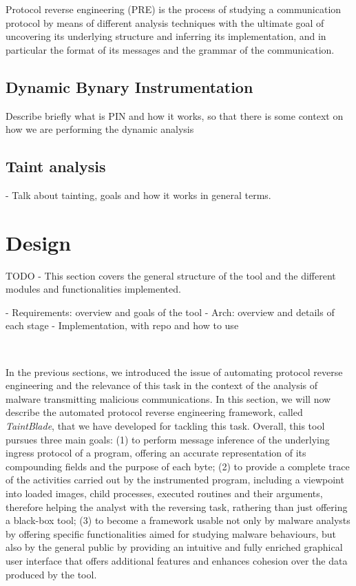 \documentclass[conference]{IEEEtran}
\begin{document}
Protocol reverse engineering (PRE) is the process of studying a communication protocol by means of 
different analysis techniques with the ultimate goal of uncovering its underlying structure and inferring
its implementation, and in particular the format of its messages and the grammar of the communication.



\subsection {Dynamic Bynary Instrumentation}
Describe briefly what is PIN and how it works, so that there is some context on how we are performing the dynamic analysis

\subsection {Taint analysis}
- Talk about tainting, goals and how it works in general terms.

\section{Design}
TODO - This section covers the general structure of the tool and the different
modules and functionalities implemented.

- Requirements: overview and goals of the tool
- Arch: overview and details of each stage
- Implementation, with repo and how to use

\

In the previous sections, we introduced the issue of automating protocol
reverse engineering and the relevance of this task in the context of the
analysis of malware transmitting malicious communications. In this section, we
will now describe the automated protocol reverse engineering framework, called
\textit{TaintBlade}, that we have developed for tackling this task. Overall,
this tool pursues three main goals: (1) to perform message inference of the
underlying ingress protocol of a program, offering an accurate representation
of its compounding fields and the purpose of each byte; (2) to provide a
complete trace of the activities carried out by the instrumented program,
including a viewpoint into loaded images, child processes, executed routines
and their arguments, therefore helping the analyst with the reversing task,
rathering than just offering a black-box tool; (3) to become a framework usable
not only by malware analysts by offering specific functionalities aimed for
studying malware behaviours, but also by the general public by providing an
intuitive and fully enriched graphical user interface that offers additional
features and enhances cohesion over the data produced by the tool.
\end{document}
